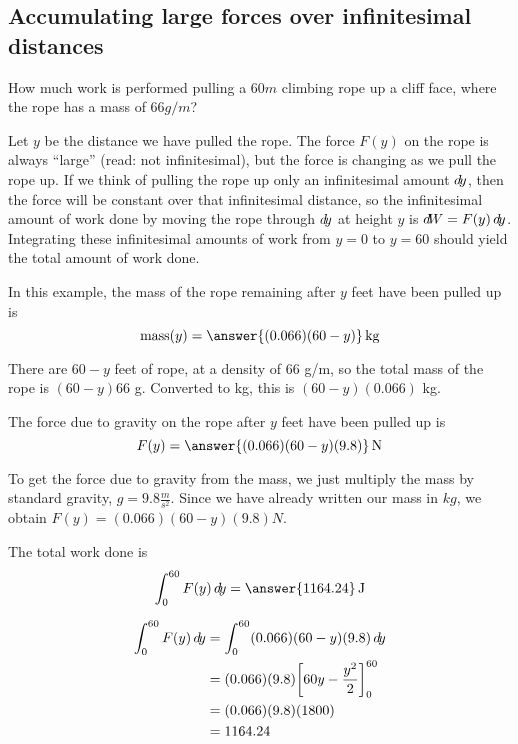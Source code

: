 \documentclass{ximera}
\begin{document}
\subsection{Accumulating large forces over infinitesimal distances}


\begin{example}
  How much work is performed pulling a $60\unit{m}$ climbing rope up a
  cliff face, where the rope has a mass of $66\unit{g}/\unit{m}$?
  \begin{explanation}
    Let $y$ be the distance we have pulled the rope.  The force $F(y)$
    on the rope is always ``large'' (read: not infinitesimal), but the
    force is changing as we pull the rope up.  If we think of pulling
    the rope up only an infinitesimal amount $\mathop{}\!d\! y$, then the force
    will be constant over that infinitesimal distance, so the
    infinitesimal amount of work done by moving the rope through $\mathop{}\!d\!
    y$ at height $y$ is $\mathop{}\!d\! W = F(y) \mathop{}\!d\! y$.  Integrating these
    infinitesimal amounts of work from $y=0$ to $y=60$ should yield
    the total amount of work done.	
    \begin{question}
      In this example, the mass of the rope remaining after $y$ feet have been pulled up is
      \[
      \mathrm{mass}(y) = \answer{(0.066)(60-y)} \unit{kg}
      \]
      \begin{hint}
	There are $60-y$ feet of rope, at a density of $66$ g/m, so
        the total mass of the rope is $(60-y)66$ g.  Converted to kg,
        this is $(60-y)(0.066)$ kg.
      \end{hint}
    \end{question}
    \begin{question}
      The force due to gravity on the rope after $y$ feet have been pulled up is
      \[
      F(y) = \answer{(0.066)(60-y)(9.8)} \unit{N} 
      \]
      \begin{hint}
	To get the force due to gravity from the mass, we just
        multiply the mass by standard gravity, $g = 9.8
        \frac{\unit{m}}{\unit{s}^2}$.  Since we have already written
        our mass in $\unit{kg}$, we obtain $F(y) = (0.066)(60-y)(9.8)
        \unit{N}$.
      \end{hint}
    \end{question}
   
    \begin{question}
      The total work done is
      \[
      \int_0^{60} F(y) \d y = \answer{1164.24} \unit{J}
      \]
      
      \begin{hint}
	\begin{align*}
	  \int_0^{60} F(y) \mathop{}\!d\! y &= \int_0^{60}(0.066)(60-y)(9.8) \mathop{}\!d\! y \\
	  &= (0.066)(9.8) \bigg[ 60y - \frac{y^2}{2} \bigg]_0^{60}\\
	  &=(0.066)(9.8)(1800)\\
	  &= 1164.24
	\end{align*}
      \end{hint}
    \end{question}
    

\end{explanation}
\end{example}
\end{document}

